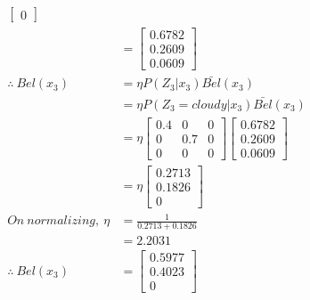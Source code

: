 \documentclass[a4paper,fleqn,11pt]{article}
\theoremstyle{mytheor}
\begin{document}
\begin{align*}
\begin{bmatrix}
								0
						   \end{bmatrix} \\
					 & = \begin{bmatrix}
							0.6782 \\
							0.2609 \\
							0.0609
						 \end{bmatrix} \\
\therefore\ Bel(x_3) & = \eta P (Z_3 | x_{3}) \bar{Bel} (x_{3}) \\
					  & = \eta P (Z_3 = cloudy | x_{3}) \bar{Bel} (x_{3}) \\
					  & = \eta 
					  	  \begin{bmatrix}
					  	  	0.4 & 0   & 0 \\
					  	  	0   & 0.7 & 0 \\
					  	  	0   & 0   & 0
					  	  \end{bmatrix}
						 \begin{bmatrix}
							0.6782 \\
							0.2609 \\
							0.0609
						 \end{bmatrix} \\
					   & = \eta
					   	   \begin{bmatrix}
					   	   		0.2713 \\
					   	   		0.1826 \\
					   	   		0
					   	   \end{bmatrix} \\
On\ normalizing,\ \eta & = \frac{1}{0.2713 + 0.1826} \\
& = 2.2031 \\
\therefore\ Bel(x_3) & = \begin{bmatrix}
								0.5977 \\
								0.4023 \\
								0
						   \end{bmatrix} \\
\end{align*}
\end{document}
